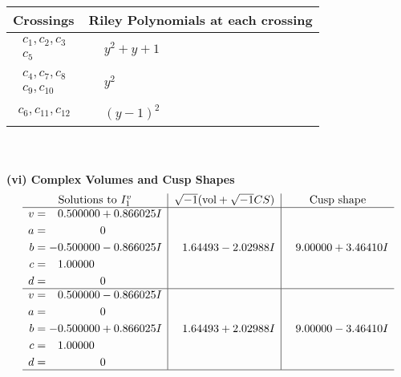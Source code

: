 \documentclass[1p]{elsarticle_modified}
\theoremstyle{definition}
\newcommand{\I}{\sqrt{-1}}
\begin{document}
\begin{tabular}{m{50pt}|m{274pt}}
Crossings & \hspace{64pt}Riley Polynomials at each crossing \\
\hline $$\begin{aligned}c_{1},c_{2},c_{3}\\c_{5}\end{aligned}$$&$\begin{aligned}
&y^2+y+1
\end{aligned}$\\
\hline $$\begin{aligned}c_{4},c_{7},c_{8}\\c_{9},c_{10}\end{aligned}$$&$\begin{aligned}
&y^2
\end{aligned}$\\
\hline $$\begin{aligned}c_{6},c_{11},c_{12}\end{aligned}$$&$\begin{aligned}
&(y-1)^2
\end{aligned}$\\
\hline
\end{tabular}\\~\\
\newpage\flushleft \textbf{(vi) Complex Volumes and Cusp Shapes}
$$\begin{array}{c|c|c}  
\text{Solutions to }I^v_{1}& \I (\text{vol} + \sqrt{-1}CS) & \text{Cusp shape}\\
 \hline 
\begin{aligned}
v &= \phantom{-}0.500000 + 0.866025 I \\
a &= \phantom{-0.000000 } 0 \\
b &= -0.500000 - 0.866025 I \\
c &= \phantom{-}1.00000\phantom{ +0.000000I} \\
d &= \phantom{-0.000000 } 0\end{aligned}
 & \phantom{-}1.64493 - 2.02988 I & \phantom{-}9.00000 + 3.46410 I \\ \hline\begin{aligned}
v &= \phantom{-}0.500000 - 0.866025 I \\
a &= \phantom{-0.000000 } 0 \\
b &= -0.500000 + 0.866025 I \\
c &= \phantom{-}1.00000\phantom{ +0.000000I} \\
d &= \phantom{-0.000000 } 0\end{aligned}
 & \phantom{-}1.64493 + 2.02988 I & \phantom{-}9.00000 - 3.46410 I\\
 \hline 
 \end{array}$$\newpage\newpage\renewcommand{\arraystretch}{1}
\end{document}
